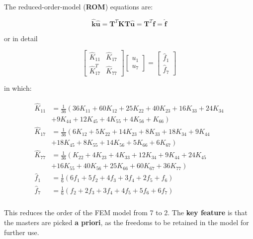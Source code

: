 \documentclass[10pt,b5paper,titlepage]{book}
\newcommand{\m}{\mathbf}
\newenvironment{eqarray}
{
    \begin{eqnarray}
        \begin{aligned}
}
{
        \end{aligned}
    \end{eqnarray}
}
\begin{document}
The reduced-order-model (\textbf{ROM}) equations are:

\begin{equation}
    \m{\hat{k}} \m{\hat{u}}
    = \m{T}^T \m{K} \m{T} \m{\hat{u}}
    = \m{T}^T \m{f}
    = \m{\hat{f}}
\end{equation}

or in detail

\begin{equation}
    \begin{bmatrix}
        \hat{K}_{11} & \hat{K}_{17} \\
        \hat{K}_{17}^T & \hat{K}_{77}
    \end{bmatrix}
    \begin{bmatrix}
        u_1 \\
        u_7
    \end{bmatrix}
    = \begin{bmatrix}
        \hat{f}_1 \\
        \hat{f}_7
    \end{bmatrix}
\end{equation}

in which:

\begin{eqarray}
    \hat{K}_{11} &= \frac{1}{36}
    \left( 36 K_{11} + 60 K_{12} + 25 K_{22} + 40 K_{23} + 16 K_{33} + 24 K_{34} \right. \\
                 &+  \left. 9 K_{44} + 12 K_{45} + 4 K_{55} + 4 K_{56} + K_{66} \right) \\
    \hat{K}_{17} &= \frac{1}{36}
    \left( 6 K_{12} + 5 K_{22} + 14 K_{23} + 8 K_{33} + 18 K_{34} + 9 K_{44} \right. \\
                 &+ \left. 18 K_{45} + 8 K_{55} + 14 K_{56} + 5 K_{66} + 6 K_{67} \right) \\
    \hat{K}_{77} &= \frac{1}{36}
    \left( K_{22} + 4 K_{23} + 4 K_{33} + 12 K_{34} + 9 K_{44} + 24 K_{45} \right. \\
                 &+ \left. 16 K_{55} + 40 K_{56} + 25 K_{66} + 60 K_{67} + 36 K_{77} \right) \\
    \hat{f}_1 & = \frac{1}{6}
    \left(
        6 f_1 + 5 f_2 + 4 f_3 + 3 f_4 + 2 f_5 + f_6
    \right) \\
    \hat{f}_7 & = \frac{1}{6}
    \left(
        f_2 + 2 f_3 + 3 f_4 + 4 f_5 + 5 f_6 + 6 f_7
    \right) \\
\end{eqarray}

This reduces the order of the FEM model from 7 to 2. The \textbf{key feature} is that
the masters are picked \textbf{a priori}, as the freedoms to be retained in the
model for further use.
\end{document}
